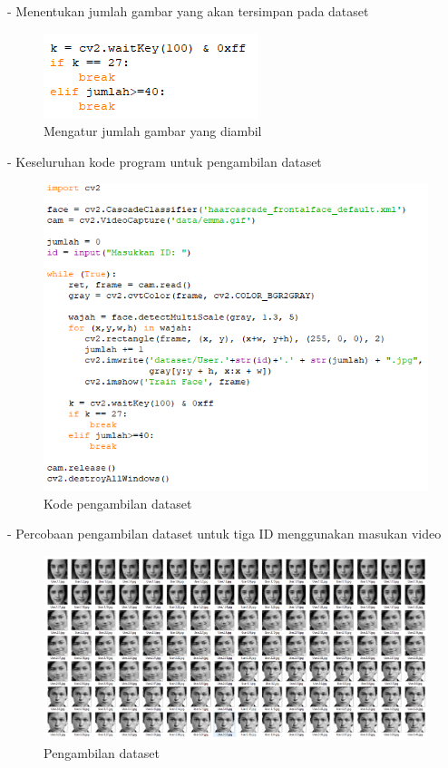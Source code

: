 \begin{enumerate}[1.]
- Menentukan jumlah gambar yang akan tersimpan pada dataset
\begin{figure}[h!]
    \centering
    \includegraphics[width=0.5\linewidth]{images/fr_6.PNG}
    \caption{Mengatur jumlah gambar yang diambil}
\end{figure}
\newpage
- Keseluruhan kode program untuk pengambilan dataset
\begin{figure}[h!]
    \centering
    \includegraphics[width=0.85\linewidth]{images/fr_full.PNG}
    \caption{Kode pengambilan dataset}
\end{figure}

- Percobaan pengambilan dataset untuk tiga ID menggunakan masukan video
\begin{figure}[h!]
    \centering
    \includegraphics[width=1.2\linewidth]{images/dataset.PNG}
    \caption{Pengambilan dataset}
\end{figure}

\end{enumerate}
